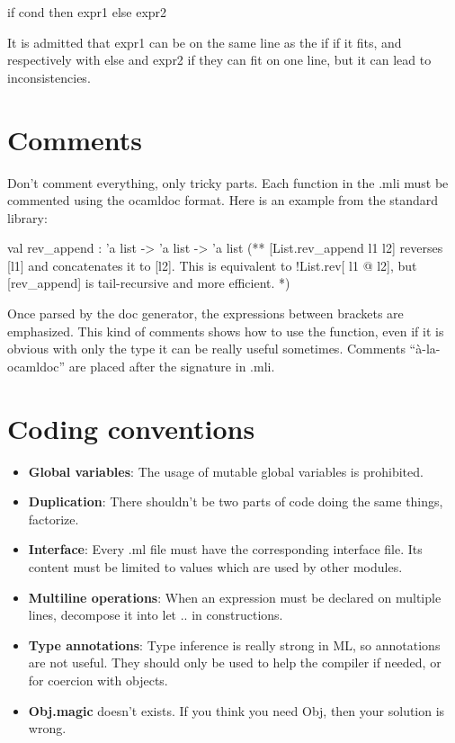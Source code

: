 \documentclass[12pt,a4paper]{article}
\begin{document}
\begin{OCaml}
if cond then
  expr1
else
  expr2
\end{OCaml} 

It is admitted that \textsf{expr1} can be on the same line as the \textsf{if} if
it fits, and respectively with \textsf{else} and \textsf{expr2} if they can fit
on one line, but it can lead to inconsistencies.

\section{Comments}

Don't comment everything, only tricky parts. Each function in the .mli must be
commented using the ocamldoc format. Here is an example from the standard
library:

\begin{OCaml}
val rev_append : 'a list -> 'a list -> 'a list
(** [List.rev_append l1 l2] reverses [l1] and concatenates it to [l2].
   This is equivalent to {!List.rev}[ l1 @ l2], but [rev_append] is
   tail-recursive and more efficient. *)
\end{OCaml}

Once parsed by the doc generator, the expressions between brackets are
emphasized. This kind of comments shows how to use the function, even if it is
obvious with only the type it can be really useful sometimes. Comments
``à-la-ocamldoc'' are placed after the signature in .mli.

\section{Coding conventions}

\begin{itemize}
\item \textbf{Global variables}: The usage of mutable global variables is
  prohibited.
\item \textbf{Duplication}: There shouldn't be two parts of code doing the same
  things, factorize.
\item \textbf{Interface}: Every .ml file must have the corresponding interface
  file. Its content must be limited to values which are used by other
  modules. 
\item \textbf{Multiline operations}: When an expression must be declared on
  multiple lines, decompose it into \textsf{let .. in} constructions.
\item \textbf{Type annotations}: Type inference is really strong in ML, so
  annotations are not useful. They should only be used to help the compiler if
  needed, or for coercion with objects.
\item \textbf{Obj.magic} doesn't exists. If you think you need \textsf{Obj},
  then your solution is wrong.
\end{itemize}
\end{document}
